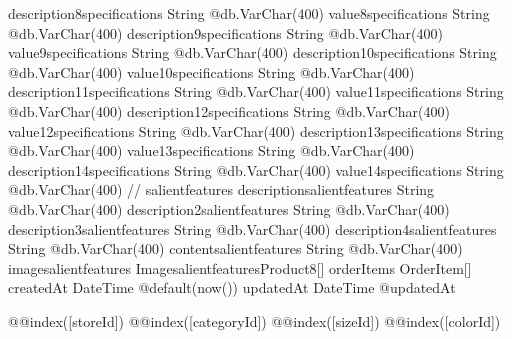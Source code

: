 {  description8specifications   String                         @db.VarChar(400)
  value8specifications         String                         @db.VarChar(400)
  description9specifications   String                         @db.VarChar(400)
  value9specifications         String                         @db.VarChar(400)
  description10specifications  String                         @db.VarChar(400)
  value10specifications        String                         @db.VarChar(400)
  description11specifications  String                         @db.VarChar(400)
  value11specifications        String                         @db.VarChar(400)
  description12specifications  String                         @db.VarChar(400)
  value12specifications        String                         @db.VarChar(400)
  description13specifications  String                         @db.VarChar(400)
  value13specifications        String                         @db.VarChar(400)
  description14specifications  String                         @db.VarChar(400)
  value14specifications        String                         @db.VarChar(400)
  // salientfeatures
  descriptionsalientfeatures   String                         @db.VarChar(400)
  description2salientfeatures  String                         @db.VarChar(400)
  description3salientfeatures  String                         @db.VarChar(400)
  description4salientfeatures  String                         @db.VarChar(400)
  contentsalientfeatures       String                         @db.VarChar(400)
  imagesalientfeatures ImagesalientfeaturesProduct8[]
  orderItems                   OrderItem[]
  createdAt                    DateTime                       @default(now())
  updatedAt                    DateTime                       @updatedAt

  @@index([storeId])
  @@index([categoryId])
  @@index([sizeId])
  @@index([colorId])
}


